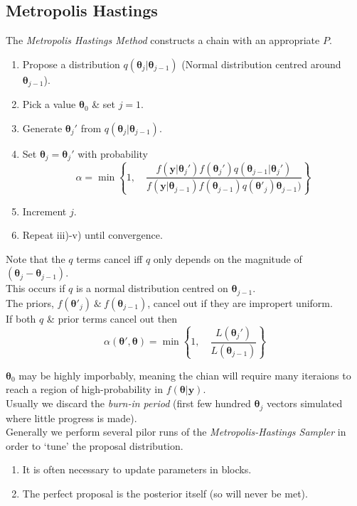 \documentclass[11pt,a4paper]{article}
\begin{document}
\subsection{Metropolis Hastings}

The \textit{Metropolis Hastings Method} constructs a chain with an appropriate $P$.\\
\begin{enumerate}
	\item Propose a distribution $q(\pmb\theta_j|\pmb\theta_{j-1})$ (\eg Normal distribution centred around $\pmb\theta_{j-1}$).
	\item Pick a value $\pmb\theta_0$ \& set $j=1$.
	\item Generate $\pmb\theta_j'$ from $q(\pmb\theta_j|\pmb\theta_{j-1})$.
	\item Set $\pmb\theta_j=\pmb\theta_j'$ with probability
	$$\alpha=\min\left\{1,\quad\dfrac{f(\textbf{y}|\pmb\theta_j')f(\pmb\theta_j')q(\pmb\theta_{j-1}|\pmb\theta_j')}{f(\textbf{y}|\pmb\theta_{j-1})f(\pmb\theta_{j-1})q(\pmb\theta'_j)\pmb\theta_{j-1})}\right\}$$
	\item Increment $j$.
	\item Repeat iii)-v) until convergence.
\end{enumerate}

Note that the $q$ terms cancel iff $q$ only depends on the magnitude of $(\pmb\theta_j-\pmb\theta_{j-1})$.\\
This occurs if $q$ is a normal distribution centred on $\pmb\theta_{j-1}$.\\
The priors, $f(\pmb\theta'_j)\ \&\ f(\pmb\theta_{j-1})$, cancel out if they are impropert uniform.\\
If both $q$ \& prior terms cancel out then
$$\alpha(\pmb\theta',\pmb\theta)=\min\left\{1,\quad\dfrac{L(\pmb\theta_j')}{L(\pmb\theta_{j-1})}\right\}$$

$\pmb\theta_0$ may be highly imporbably, meaning the chian will require many iteraions to reach a region of high-probability in $f(\pmb\theta|\textbf{y})$.\\
Usually we discard the \textit{burn-in period} (\ie first few hundred $\pmb\theta_j$ vectors simulated where little progress is made).\\

Generally we perform several pilor runs of the \textit{Metropolis-Hastings Sampler} in order to `tune' the proposal distribution.
\begin{enumerate}
	\item It is often necessary to update parameters in blocks.
	\item The perfect proposal is the posterior itself (so will never be met).
\end{enumerate}
\end{document}
